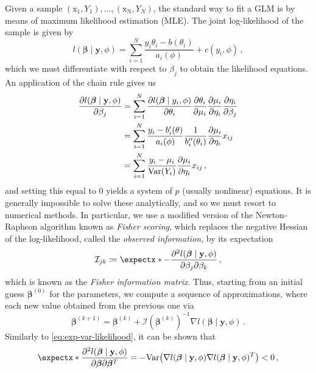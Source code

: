 \documentclass[a4paper]{book}
\begin{document}
Given a sample $(\bm{\mathrm{x_1}}, Y_1), \dots, (\bm{\mathrm{x_N}}, Y_N)$, the standard way to fit a GLM is by means of maximum likelihood estimation (MLE). The joint log-likelihood of the sample is given by
\begin{equation} \label{eq:joint-log-likelihood}
  l(\bm{\beta} \mid \mathbf{y}, \phi) = \sum_{i = 1}^N \frac{y_i \theta_i - b(\theta_i)}{a_i(\phi)} + c(y_i, \phi) \,,
\end{equation}
which we must differentiate with respect to $\beta_j$ to obtain the likelihood equations. An application of the chain rule gives us 
\begin{align}
  \frac{\partial l(\bm{\beta} \mid \mathbf{y}, \phi)}{\partial \beta_j} &= \sum_{i = 1}^N \frac{\partial l(\bm{\beta} \mid y_i, \phi)}{\partial \theta_i} \frac{\partial \theta_i}{\partial \mu_i} \frac{\partial \mu_i}{\partial \eta_i} \frac{\partial \eta_i}{\partial \beta_j} \\
  &= \sum_{i = 1}^N \frac{y_i - b'_i(\theta)}{a_i(\phi)} \frac{1}{b_i''(\theta_i)} \frac{\partial \mu_i}{\partial \eta_i} x_{ij} \\
  &= \sum_{i = 1}^N \frac{y_i - \mu_i}{\var{Y_i}} \frac{\partial \mu_i}{\partial \eta_i} x_{ij} \,, \label{eq:grad-likelihood}
\end{align}
and setting this equal to $0$ yields a system of $p$ (usually nonlinear) equations. It is generally impossible to solve these analytically, and so we must resort to numerical methods. In particular, we use a modified version of the Newton-Raphson algorithm known as \emph{Fisher scoring}, which replaces the negative Hessian of the log-likelihood, called the \emph{observed information}, by its expectation
\begin{equation}
  \mathcal{I}_{jk} \coloneqq \expect{-\frac{\partial^2 l(\bm{\beta} \mid \mathbf{y}, \phi)}{\partial \beta_j \partial \beta_k}} \,,
\end{equation}
which is known as the \emph{Fisher information matrix}. Thus, starting from an initial guess $\bm{\beta}^{(0)}$ for the parameters, we compute a sequence of approximations, where each new value obtained from the previous one via
\begin{equation} \label{eq:fischer-scoring}
  \bm{\beta}^{(k + 1)} = \bm{\beta}^{(k)} + \mathcal{I}(\bm{\beta}^{(k)})^{-1} \nabla l(\bm{\beta} \mid \mathbf{y}, \phi) \,.
\end{equation}
Similarly to \cref{eq:exp-var-likelihood}, it can be shown that
\begin{equation}
  \expect{\frac{\partial^2 l(\bm{\beta} \mid \mathbf{y}, \phi)}{\partial \bm{\beta} \partial \bm{\beta}^T}} = -\var{\nabla l(\bm{\beta} \mid \mathbf{y}, \phi) \nabla l(\bm{\beta} \mid \mathbf{y}, \phi)^T} < 0 \,,
\end{equation}
\end{document}
